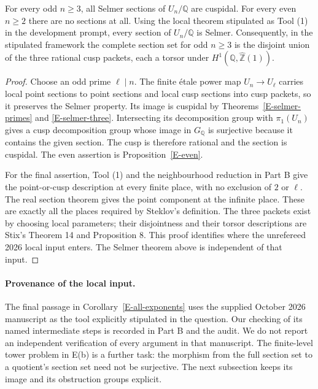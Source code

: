 \begin{corollary}
\label{E-all-exponents}
For every odd $n\geq3$, all Selmer sections of
$U_n/\mathbb Q$ are cuspidal. For every even
$n\geq2$ there are no sections at all.
Using the local theorem stipulated as Tool (1)
in the development prompt, every section of
$U_n/\mathbb Q$ is Selmer. Consequently,
in the stipulated framework the complete
section set for odd $n\geq3$ is the disjoint
union of the three rational cusp packets,
each a torsor under
$H^1(\mathbb Q,\widehat{\mathbb Z}(1))$.
\end{corollary}
\begin{proof}
Choose an odd prime $\ell\mid n$. The finite étale
power map $U_n\to U_\ell$ carries local point
sections to point sections and local cusp
sections into cusp packets, so it preserves
the Selmer property. Its image is cuspidal
by Theorems~\ref{E-selmer-primes} and
\ref{E-selmer-three}. Intersecting its
decomposition group with $\pi_1(U_n)$ gives
a cusp decomposition group whose image in
$G_{\mathbb Q}$ is surjective because it
contains the given section. The cusp is
therefore rational and the section is
cuspidal. The even assertion is
Proposition~\ref{E-even}.

For the final assertion, Tool (1) and the
neighbourhood reduction in Part B give the
point-or-cusp description at every finite
place, with no exclusion of $2$ or $\ell$.
The real section theorem gives the point
component at the infinite place.
These are exactly all the places required
by Steklov's definition. The three packets
exist by choosing local parameters; their
disjointness and their torsor descriptions
are Stix's Theorem 14 and Proposition 8.
This proof identifies where the unrefereed
2026 local input enters. The Selmer theorem
above is independent of that input.
\end{proof}

\paragraph{Provenance of the local input.}
The final passage in Corollary~\ref{E-all-exponents}
uses the supplied October 2026 manuscript as
the tool explicitly stipulated in the question.
Our checking of its named intermediate steps
is recorded in Part B and the audit.
We do not report an independent verification
of every argument in that manuscript.
The finite-level tower problem in E(b) is
a further task: the morphism from the full
section set to a quotient's section set need
not be surjective. The next subsection keeps
its image and its obstruction groups explicit.

